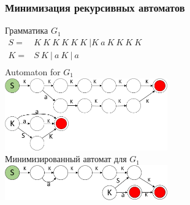 \documentclass{beamer}
\begin{document}
	\begin{frame} 
		\frametitle{Минимизация рекурсивных автоматов}
		\vspace{-12pt}
		\begin{center}
			{Грамматика $G_1$\\
			\vspace{5pt}
			$
			\begin{array}{rl}
			S =& K\ K\ K\ K\ K\ K \ |K\ a\ K\ K\ K\ K \\
			K =& S\ K\ |\ a\ K\ |\ a \\
			\end{array}
			$
			}
		    \\
		    \vspace{12pt}
		    Automaton for $G_1$
		    \\
		    \vspace{5pt}
		    {
				\includegraphics[width=7cm]{pictures/G1initial.pdf}
			}\\
			\vspace{8pt}
			Минимизированный автомат для $G_1$
			\\
			\vspace{5pt}
		    {
				\includegraphics[width=7cm]{pictures/G1automaton.pdf}
			}
		\end{center}
	\end{frame}
	
\end{document}
